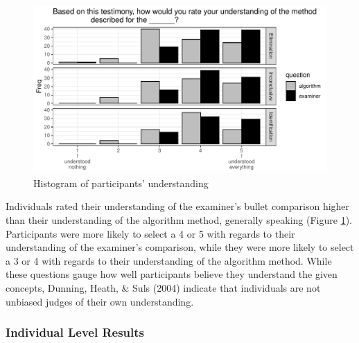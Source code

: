 \documentclass[print]{nuthesis}
\begin{document}
\begin{figure}

{\centering \includegraphics[width=\linewidth]{thesis_files/figure-latex/histunder-1} 

}

\caption{Histogram of participants' understanding}\label{fig:histunder}
\end{figure}

Individuals rated their understanding of the examiner's bullet comparison higher than their understanding of the algorithm method, generally speaking (Figure \ref{fig:histunder}).
Participants were more likely to select a 4 or 5 with regards to their understanding of the examiner's comparison, while they were more likely to select a 3 or 4 with regards to their understanding of the algorithm method.
While these questions gauge how well participants believe they understand the given concepts, Dunning, Heath, \& Suls (2004) indicate that individuals are not unbiased judges of their own understanding.

\hypertarget{individual-level-results}{%
\subsubsection{Individual Level Results}\label{individual-level-results}}
\end{document}
